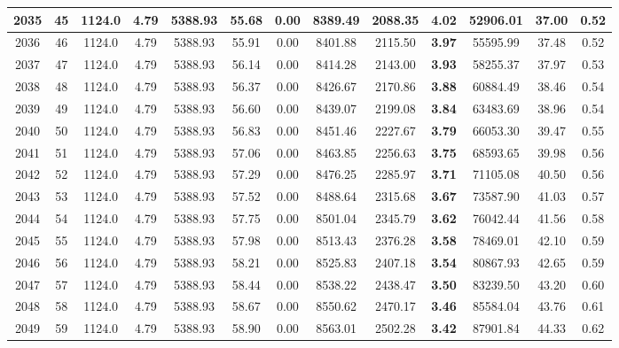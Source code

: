 {\begin{center}
\begin{tabular}[htb]{|c|c||c|c|c|c|c|c||c|c||c|c|c||}
\hline 
 2035 &  45 &  1124.0 &  4.79 &  5388.93 &  55.68 &  0.00 &  8389.49 &  2088.35 &  {\bf 4.02} &  52906.01 &  37.00 &  0.52 \\ 
\hline 
 2036 &  46 &  1124.0 &  4.79 &  5388.93 &  55.91 &  0.00 &  8401.88 &  2115.50 &  {\bf 3.97} &  55595.99 &  37.48 &  0.52 \\ 
\hline 
 2037 &  47 &  1124.0 &  4.79 &  5388.93 &  56.14 &  0.00 &  8414.28 &  2143.00 &  {\bf 3.93} &  58255.37 &  37.97 &  0.53 \\ 
\hline 
 2038 &  48 &  1124.0 &  4.79 &  5388.93 &  56.37 &  0.00 &  8426.67 &  2170.86 &  {\bf 3.88} &  60884.49 &  38.46 &  0.54 \\ 
\hline 
 2039 &  49 &  1124.0 &  4.79 &  5388.93 &  56.60 &  0.00 &  8439.07 &  2199.08 &  {\bf 3.84} &  63483.69 &  38.96 &  0.54 \\ 
\hline 
 2040 &  50 &  1124.0 &  4.79 &  5388.93 &  56.83 &  0.00 &  8451.46 &  2227.67 &  {\bf 3.79} &  66053.30 &  39.47 &  0.55 \\ 
\hline 
 2041 &  51 &  1124.0 &  4.79 &  5388.93 &  57.06 &  0.00 &  8463.85 &  2256.63 &  {\bf 3.75} &  68593.65 &  39.98 &  0.56 \\ 
\hline 
 2042 &  52 &  1124.0 &  4.79 &  5388.93 &  57.29 &  0.00 &  8476.25 &  2285.97 &  {\bf 3.71} &  71105.08 &  40.50 &  0.56 \\ 
\hline 
 2043 &  53 &  1124.0 &  4.79 &  5388.93 &  57.52 &  0.00 &  8488.64 &  2315.68 &  {\bf 3.67} &  73587.90 &  41.03 &  0.57 \\ 
\hline 
 2044 &  54 &  1124.0 &  4.79 &  5388.93 &  57.75 &  0.00 &  8501.04 &  2345.79 &  {\bf 3.62} &  76042.44 &  41.56 &  0.58 \\ 
\hline 
 2045 &  55 &  1124.0 &  4.79 &  5388.93 &  57.98 &  0.00 &  8513.43 &  2376.28 &  {\bf 3.58} &  78469.01 &  42.10 &  0.59 \\ 
\hline 
 2046 &  56 &  1124.0 &  4.79 &  5388.93 &  58.21 &  0.00 &  8525.83 &  2407.18 &  {\bf 3.54} &  80867.93 &  42.65 &  0.59 \\ 
\hline 
 2047 &  57 &  1124.0 &  4.79 &  5388.93 &  58.44 &  0.00 &  8538.22 &  2438.47 &  {\bf 3.50} &  83239.50 &  43.20 &  0.60 \\ 
\hline 
 2048 &  58 &  1124.0 &  4.79 &  5388.93 &  58.67 &  0.00 &  8550.62 &  2470.17 &  {\bf 3.46} &  85584.04 &  43.76 &  0.61 \\ 
\hline 
 2049 &  59 &  1124.0 &  4.79 &  5388.93 &  58.90 &  0.00 &  8563.01 &  2502.28 &  {\bf 3.42} &  87901.84 &  44.33 &  0.62 \\ 

\end{tabular}
\end{center}}

